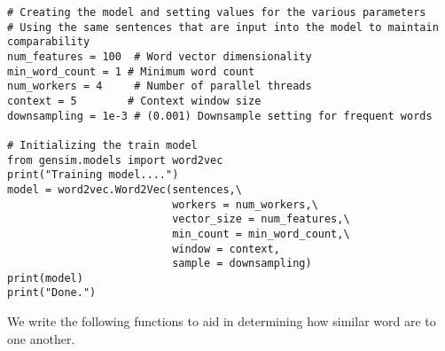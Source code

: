 \documentclass[12pt, letterpaper]{article}
\begin{document}
\begin{mdframed}[backgroundcolor=shadecolor]
\begin{verbatim}
# Creating the model and setting values for the various parameters
# Using the same sentences that are input into the model to maintain comparability
num_features = 100  # Word vector dimensionality
min_word_count = 1 # Minimum word count
num_workers = 4     # Number of parallel threads
context = 5        # Context window size
downsampling = 1e-3 # (0.001) Downsample setting for frequent words

# Initializing the train model
from gensim.models import word2vec
print("Training model....")
model = word2vec.Word2Vec(sentences,\
                          workers = num_workers,\
                          vector_size = num_features,\
                          min_count = min_word_count,\
                          window = context,
                          sample = downsampling)
print(model)
print("Done.")
\end{verbatim}
\end{mdframed}

We write the following functions to aid in determining how similar word are to one another.
\end{document}
